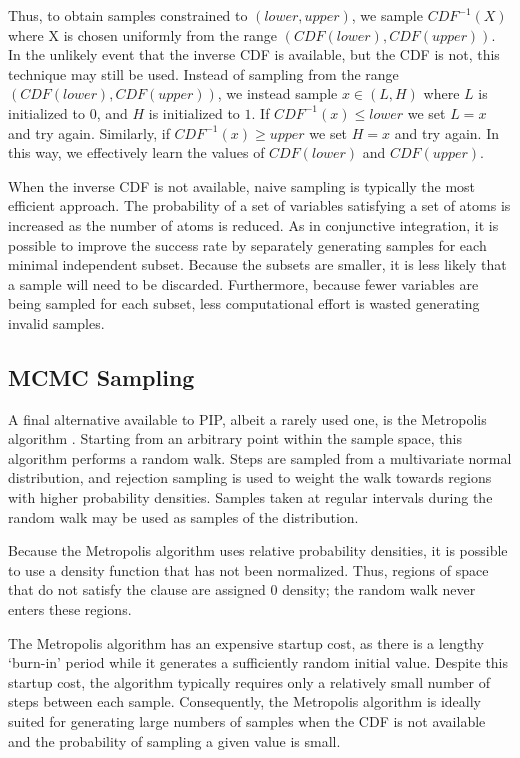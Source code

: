 Thus, to obtain samples constrained  to  $(lower, upper)$, we
sample  $CDF^{-1}(X)$  where X  is  chosen  uniformly  from the  range
$(CDF(lower), CDF(upper))$.   In the  unlikely event that  the inverse
CDF is  available, but  the CDF  is not, this  technique may  still be
used.  Instead of sampling  from the range $(CDF(lower), CDF(upper))$,
we instead sample  $x \in (L,H)$ where $L$ is  initialized to $0$, and
$H$ is initialized to $1$.  If $CDF^{-1}(x) \leq lower$ we set $L = x$
and try again.  Similarly, if $CDF^{-1}(x)  \geq upper$ we set $H = x$
and  try again.   In  this way,  we  effectively learn  the values  of
$CDF(lower)$ and $CDF(upper)$.

When the inverse CDF is not available, naive sampling is typically the
most  efficient  approach.  The  probability  of  a  set of  variables
satisfying  a set  of atoms  is increased  as the  number of  atoms is
reduced.  As in conjunctive integration, it is possible to improve the
success  rate  by  separately  generating  samples  for  each  minimal
independent  subset.  Because  the  subsets are  smaller,  it is  less
likely that a sample will  need to be discarded.  Furthermore, because
fewer variables are being  sampled for each subset, less computational
effort is wasted generating invalid samples.

\subsection{MCMC Sampling}

A final alternative available to PIP, albeit a rarely used one, is the
Metropolis  algorithm \cite{metropolis}.   Starting from  an arbitrary
point within the sample space,  this algorithm performs a random walk.
Steps  are  sampled  from  a  multivariate  normal  distribution,  and
rejection sampling  is used  to weight the  walk towards  regions with
higher  probability  densities.  Samples  taken  at regular  intervals
during the random walk may be used as samples of the distribution.

Because the Metropolis  algorithm uses relative probability densities,
it is possible to use a density function that has not been normalized.
Thus, regions of  space that do not satisfy the  clause are assigned 0
density; the random walk never enters these regions.

The Metropolis algorithm has an  expensive startup cost, as there is a
lengthy  `burn-in' period  while  it generates  a sufficiently  random
initial  value.  Despite  this startup  cost, the  algorithm typically
requires only a relatively small  number of steps between each sample.
Consequently,   the  Metropolis  algorithm   is  ideally   suited  for
generating large numbers of samples  when the CDF is not available and
the probability of sampling a given value is small.

